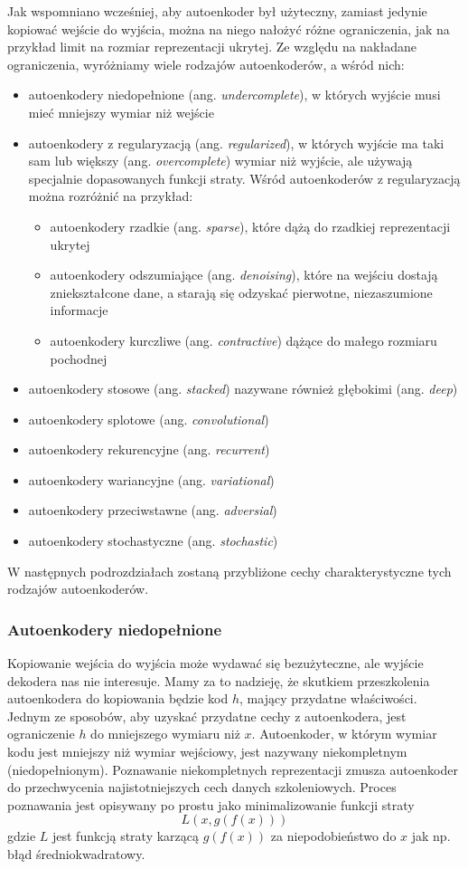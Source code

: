 \documentclass[12pt]{mwbk}
\theoremstyle{plain}
\theoremstyle{definition}
\theoremstyle{remark}
\begin{document}
Jak wspomniano wcześniej, aby autoenkoder był użyteczny, zamiast jedynie kopiować wejście do wyjścia, można na niego nałożyć różne ograniczenia, jak na przykład limit na rozmiar reprezentacji ukrytej. Ze względu na nakładane ograniczenia, wyróżniamy wiele rodzajów autoenkoderów, a wśród nich:
\begin{itemize}
	\item  autoenkodery niedopełnione (ang. \emph{undercomplete}), w których wyjście musi mieć mniejszy wymiar niż wejście
 \item autoenkodery z regularyzacją (ang. \emph{regularized}), w których wyjście ma taki sam lub większy (ang. \emph{overcomplete}) wymiar niż wyjście, ale używają specjalnie dopasowanych funkcji straty. Wśród autoenkoderów z regularyzacją można rozróżnić na przykład:
 \begin{itemize}
 	\item autoenkodery rzadkie (ang. \emph{sparse}), które dążą do rzadkiej reprezentacji ukrytej
 	\item autoenkodery odszumiające (ang. \emph{denoising}), które na wejściu dostają zniekształcone dane, a starają się odzyskać pierwotne, niezaszumione informacje
 	\item autoenkodery kurczliwe (ang. \emph{contractive}) dążące do małego rozmiaru pochodnej
 \end{itemize}
\item autoenkodery stosowe (ang. \emph{stacked}) nazywane również głębokimi (ang. \emph{deep})
\item autoenkodery splotowe (ang. \emph{convolutional})
\item autoenkodery rekurencyjne (ang. \emph{recurrent})
\item autoenkodery wariancyjne (ang. \emph{variational})
\item autoenkodery przeciwstawne (ang. \emph{adversial})
\item autoenkodery stochastyczne (ang. \emph{stochastic})
\end{itemize}
W następnych podrozdziałach zostaną przybliżone cechy charakterystyczne tych rodzajów autoenkoderów.

\subsubsection{Autoenkodery niedopełnione}

Kopiowanie wejścia do wyjścia może wydawać się bezużyteczne, ale wyjście dekodera nas nie interesuje. Mamy za to nadzieję, że skutkiem przeszkolenia autoenkodera do kopiowania będzie kod $h$, mający przydatne właściwości.
Jednym ze sposobów, aby uzyskać przydatne cechy z autoenkodera, jest ograniczenie $h$ do mniejszego wymiaru niż $x$. Autoenkoder, w którym wymiar kodu jest mniejszy niż wymiar wejściowy, jest nazywany niekompletnym (niedopełnionym).
Poznawanie niekompletnych reprezentacji zmusza autoenkoder do przechwycenia najistotniejszych cech danych szkoleniowych.
Proces poznawania jest opisywany po prostu jako minimalizowanie funkcji straty
$$L(x, g(f(x)))$$
gdzie $L$ jest funkcją straty karzącą $g(f(x))$ za niepodobieństwo do $x$ jak np. błąd średniokwadratowy.
\end{document}
